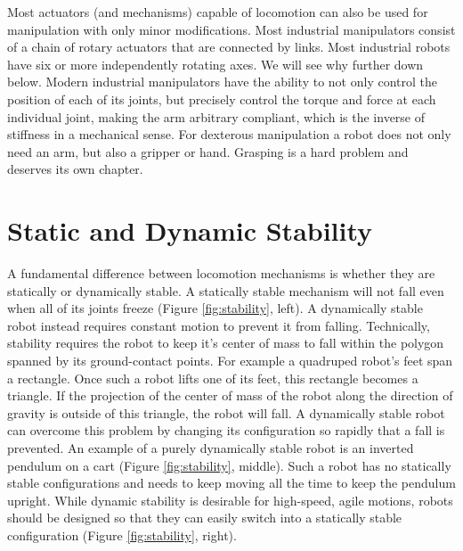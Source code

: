 Most actuators (and mechanisms) capable of locomotion can also be used for manipulation with only minor modifications. Most industrial manipulators consist of a chain of rotary actuators that are connected by links. Most industrial robots have six or more independently rotating axes. We will see why further down below. Modern industrial manipulators have the ability to not only control the position of each of its joints, but precisely control the torque and force at each individual joint, making the arm arbitrary compliant, which is the inverse of stiffness in a mechanical sense. For dexterous manipulation a robot does not only need an arm, but also a gripper or hand. Grasping is a hard problem and deserves its own chapter. 


\section{Static and Dynamic Stability}\label{sec:stability}
A fundamental difference between locomotion mechanisms is whether they are statically or dynamically stable. A statically stable mechanism will not fall even when all of its joints freeze (Figure \ref{fig:stability}, left). A dynamically stable robot instead requires constant motion to prevent it from falling. Technically, stability requires the robot to keep it's center of mass to fall within the polygon spanned by its ground-contact points. For example a quadruped robot's feet span a rectangle. Once such a robot lifts one of its feet, this rectangle becomes a triangle. If the projection of the center of mass of the robot along the direction of gravity is outside of this triangle, the robot will fall. A dynamically stable robot can overcome this problem by changing its configuration so rapidly that a fall is prevented. An example of a purely dynamically stable robot is an inverted pendulum on a cart  (Figure \ref{fig:stability}, middle). Such a robot has no statically stable configurations and needs to keep moving all the time to keep the pendulum upright. While dynamic stability is desirable for high-speed, agile motions, robots should be designed so that they can easily switch into a statically stable configuration (Figure \ref{fig:stability}, right). 

